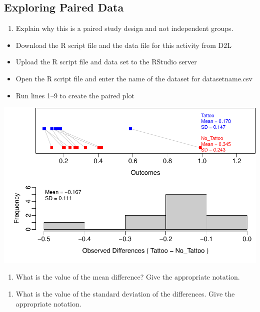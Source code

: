 \documentclass[
]{report}
\providecommand{\tightlist}{%
  \setlength{\itemsep}{0pt}\setlength{\parskip}{0pt}}
\begin{document}
\subsection{Exploring Paired Data}\label{exploring-paired-data}

\begin{enumerate}
\def\labelenumi{\arabic{enumi}.}
\setcounter{enumi}{4}
\tightlist
\item
  Explain why this is a paired study design and not independent groups.
\end{enumerate}

\vspace{1in}

\begin{itemize}
\item
  Download the R script file and the data file for this activity from D2L
\item
  Upload the R script file and data set to the RStudio server
\item
  Open the R script file and enter the name of the dataset for datasetname.csv
\item
  Run lines 1--9 to create the paired plot
\end{itemize}

\begin{center}\includegraphics[width=0.7\linewidth]{11-A21-EDA-paired_files/figure-latex/unnamed-chunk-1-1} \end{center}

\begin{enumerate}
\def\labelenumi{\arabic{enumi}.}
\setcounter{enumi}{5}
\tightlist
\item
  What is the value of the mean difference? Give the appropriate notation.
\end{enumerate}

\vspace{0.2in}

\begin{enumerate}
\def\labelenumi{\arabic{enumi}.}
\setcounter{enumi}{6}
\tightlist
\item
  What is the value of the standard deviation of the differences. Give the appropriate notation.
\end{enumerate}
\end{document}
